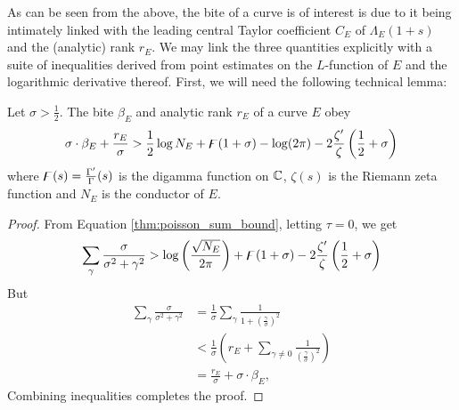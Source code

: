 As can be seen from the above, the bite of a curve is of interest is due to it being intimately linked with the leading central Taylor coefficient $C_E$ of $\Lambda_E(1+s)$ and the (analytic) rank $r_E$. We may link the three quantities explicitly with a suite of inequalities derived from point estimates on the $L$-function of $E$ and the logarithmic derivative thereof. First, we will need the following technical lemma:
\begin{lemma}[GRH]\label{lem:bite_rank_sigma_inequality}
Let $\sigma > \frac{1}{2}$. The bite $\beta_E$ and analytic rank $r_E$ of a curve $E$ obey
\begin{equation}
\sigma \cdot \beta_E + \frac{r_E}{\sigma} > \frac{1}{2} \log N_E + \digamma(1+\sigma)-\log(2\pi) - 2\frac{\zeta^{\prime}}{\zeta}\left(\frac{1}{2}+\sigma\right)
\end{equation}
where $\digamma(s) = \frac{\Gamma^{\prime}}{\Gamma}(s)$ is the digamma function on $\mathbb{C}$, $\zeta(s)$ is the Riemann zeta function and $N_E$ is the conductor of $E$.
\end{lemma}
\begin{proof}
From Equation \ref{thm:poisson_sum_bound}, letting $\tau=0$, we get
\begin{equation}
\sum_\gamma \frac{\sigma}{\sigma^2+\gamma^2} > \log\left(\frac{\sqrt{N_E}}{2\pi}\right) + \digamma(1+\sigma) - 2\frac{\zeta^{\prime}}{\zeta}\left(\frac{1}{2}+\sigma\right)
\end{equation}
But
\begin{align*}
\sum_\gamma \frac{\sigma}{\sigma^2+\gamma^2} &= \frac{1}{\sigma} \sum_\gamma \frac{1}{1+\left(\frac{\gamma}{\sigma}\right)^2} \\
&< \frac{1}{\sigma}\left(r_E + \sum_{\gamma\ne 0} \frac{1}{\left(\frac{\gamma}{\sigma}\right)^2} \right) \\
&= \frac{r_E}{\sigma} + \sigma\cdot \beta_E,
\end{align*}
Combining inequalities completes the proof.
\end{proof}


